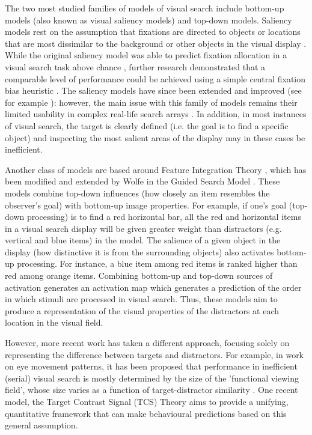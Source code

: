 \documentclass[smallextended]{svjour3}       %
\begin{document}
The two most studied families of models of visual search include bottom-up models (also known as visual saliency models) and top-down models. Saliency models rest on the assumption that fixations are directed to objects or locations that are most dissimilar to the background or other objects in the visual display \cite{itti2000saliency, itti1998model, koch1987shifts}. While the original saliency model was able to predict fixation allocation in a visual search task above chance \cite{parkhurst2002modeling}, further research demonstrated that a comparable level of performance could be achieved using a simple central fixation bias heuristic \cite{tatler2007central}. The saliency models have since been extended and improved (see for example \cite{zhang2008sun}): however, the main issue with this family of models remains their limited usability in complex real-life search arrays \cite{tatler2011eye, koehler2014saliency}. In addition, in most instances of visual search, the target is clearly defined (i.e. the goal is to find a specific object) and inspecting the most salient areas of the display may in these cases be inefficient.

Another class of models are based around Feature Integration Theory \cite{treisman1980feature}, which has been modified and extended by Wolfe in the Guided Search Model \cite{wolfe1989guided,wolfe2014approaches}. These models combine top-down influences (how closely an item resembles the observer's goal) with bottom-up image properties. For example, if one's goal (top-down processing) is to find a red horizontal bar, all the red and horizontal items in a visual search display will be given greater weight than distractors (e.g. vertical and blue items) in the model. The salience of a given object in the display (how distinctive it is from the surrounding objects) also activates bottom-up processing. For instance, a blue item among red items is ranked higher than red among orange items. Combining bottom-up and top-down sources of activation generates an activation map which generates a prediction of the order in which stimuli are processed in visual search. Thus, these models aim to produce a representation of the visual properties of the distractors at each location in the visual field. 
 
However, more recent work has taken a different approach, focusing solely on representing the difference between targets and distractors. For example, in work on eye movement patterns, it has been proposed that performance in inefficient (serial) visual search is mostly determined by the size of the 'functional viewing field', whose size varies as a function of target-distractor similarity \cite{hulleman2017brink}. One recent model, the Target Contrast Signal (TCS) Theory \cite{lleras2020target} aims to provide a unifying, quantitative framework that can make behavioural predictions based on this general assumption.
\end{document}
